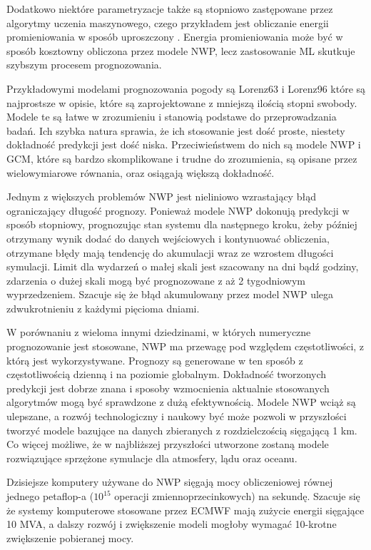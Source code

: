 Dodatkowo niektóre parametryzacje także są stopniowo zastępowane przez algorytmy uczenia maszynowego,
czego przykładem jest obliczanie energii promieniowania w sposób uproszczony
\cite{ai-in-weather-and-climate-prediction}. Energia promieniowania
może być w sposób kosztowny obliczona przez modele NWP, lecz zastosowanie ML skutkuje szybszym
procesem prognozowania.

Przykładowymi modelami prognozowania pogody są Lorenz63 i Lorenz96\cite{ai-in-weather-and-climate-prediction}
które są najprostsze w opisie,
które są zaprojektowane z mniejszą ilością stopni swobody. Modele te są łatwe w zrozumieniu i 
stanowią podstawe do przeprowadzania badań. Ich szybka natura sprawia, że ich stosowanie jest dość
proste, niestety dokładność predykcji jest dość niska. Przeciwieństwem do nich są modele NWP i GCM,
które są bardzo skomplikowane i trudne do zrozumienia, są opisane przez wielowymiarowe równania, oraz
osiągają większą dokładność.

Jednym z większych problemów NWP jest nieliniowo wzrastający błąd ograniczający długość prognozy.
Ponieważ modele NWP dokonują predykcji w sposób stopniowy, prognozując stan systemu dla następnego
kroku, żeby później otrzymany wynik dodać do danych wejściowych i kontynuować obliczenia, otrzymane błędy
mają tendencję do akumulacji wraz ze wzrostem długości symulacji.
Limit dla wydarzeń o małej skali jest szacowany na dni bądź godziny, zdarzenia o dużej skali
mogą być prognozowane z aż 2 tygodniowym wyprzedzeniem. Szacuje się że błąd akumulowany przez 
model NWP ulega zdwukrotnieniu z każdymi pięcioma dniami.

W porównaniu z wieloma innymi dziedzinami, w których numeryczne prognozowanie jest stosowane,
NWP ma przewagę pod względem częstotliwości, z którą jest wykorzystywane. Prognozy są generowane
w ten sposób z częstotliwością dzienną i na poziomie globalnym. Dokładność tworzonych predykcji jest
dobrze znana i sposoby wzmocnienia aktualnie stosowanych algorytmów mogą być sprawdzone z dużą
efektywnością. Modele NWP wciąż są ulepszane, a rozwój technologiczny i naukowy być może pozwoli
w przyszłości tworzyć modele bazujące na danych zbieranych z rozdzielczością sięgającą 1 km. Co więcej
możliwe, że w najbliższej przyszłości utworzone zostaną modele rozwiązujące sprzężone symulacje
dla atmosfery, lądu oraz oceanu\cite{nwp-the-quiet-revolution}.

Dzisiejsze komputery używane do NWP sięgają mocy obliczeniowej równej jednego petaflop-a ($10^{15}$ operacji
zmiennoprzecinkowych) na sekundę. Szacuje się że systemy komputerowe stosowane przez ECMWF mają zużycie energii
sięgające 10 MVA, a dalszy rozwój i zwiększenie modeli mogłoby wymagać 10-krotne zwiększenie pobieranej mocy.

